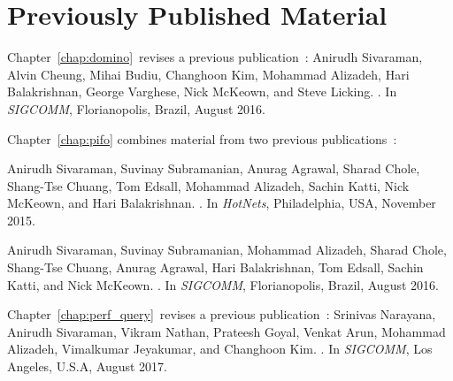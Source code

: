 \chapter*{Previously Published Material}
%

{
\setlength{\parindent}{0 pt}
\setlength{\parskip}{\baselineskip}

Chapter~\ref{chap:domino}~revises a previous
publication~\cite{domino_sigcomm}:
Anirudh Sivaraman, Alvin Cheung, Mihai Budiu, Changhoon Kim, Mohammad Alizadeh, Hari Balakrishnan, George Varghese, Nick McKeown, and Steve Licking.
.
\newblock In {\em SIGCOMM}, Florianopolis, Brazil, August 2016.

Chapter~\ref{chap:pifo} combines material from two previous
publications~\cite{pifo_hotnets, pifo_sigcomm}:
\begin{CompactEnumerate}
\item
Anirudh Sivaraman, Suvinay Subramanian, Anurag Agrawal, Sharad Chole, Shang-Tse Chuang, Tom Edsall, Mohammad Alizadeh, Sachin Katti, Nick McKeown, and Hari Balakrishnan.
.
\newblock In {\em HotNets}, Philadelphia, USA, November 2015.

\item
Anirudh Sivaraman, Suvinay Subramanian, Mohammad Alizadeh, Sharad Chole, Shang-Tse Chuang, Anurag Agrawal, Hari Balakrishnan, Tom Edsall, Sachin Katti, and Nick McKeown.
.
\newblock In {\em SIGCOMM}, Florianopolis, Brazil, August 2016.
\end{CompactEnumerate}

Chapter~\ref{chap:perf_query}~revises a previous publication~\cite{perf_query}:
Srinivas Narayana, Anirudh Sivaraman, Vikram Nathan, Prateesh Goyal, Venkat Arun, Mohammad Alizadeh, Vimalkumar Jeyakumar, and Changhoon Kim.
.
\newblock In {\em SIGCOMM}, Los Angeles, U.S.A, August 2017.
}
